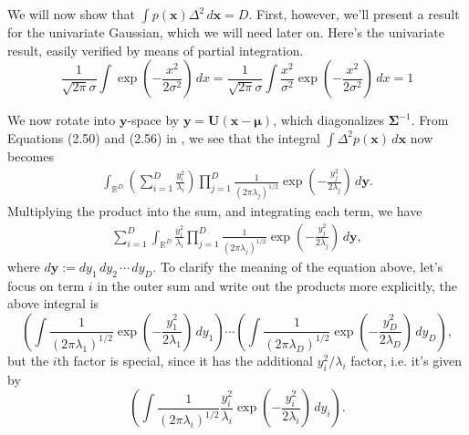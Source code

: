 \documentclass[12pt, a4paper]{article}
\newcommand{\R}{\mathbb{R}}
\newcommand{\vect}[1]{\bm{#1}}
\begin{document}
We will now show that $\int p(\vect{x}) \Delta^2 \, d\vect{x} = D$.
First, however, we'll present a result for the univariate Gaussian, which we will need later on. 
Here's the univariate result, easily verified by means of partial integration.
\begin{equation}
\label{eqn:ch2_problem15_a}
	\frac{1}{\sqrt{2 \pi} \sigma} \int \exp \left( - \frac{x^2}{2 \sigma^2}\right) \, dx = 
	\frac{1}{\sqrt{2 \pi} \sigma} \int \frac{x^2}{\sigma^2} \exp \left( - \frac{x^2}{2 \sigma^2}\right) \, dx = 1
\end{equation}

We now rotate into $\vect{y}$-space by $\vect{y} = \vect{U}(\vect{x} - \vect{\mu})$, which diagonalizes $\vect{\Sigma}^{-1}$.
From Equations (2.50) and (2.56) in \cite{bishop_pattern_2011}, we see that the integral $\int \Delta^2  p(\vect{x}) \, d\vect{x}$ now becomes
\begin{align*}
	\int_{\R^D} \left( \sum_{i=1}^{D} \frac{y_i^2}{\lambda_i} \right)
	\prod_{j=1}^{D} \frac{1}{(2 \pi \lambda_j)^{1/2}} 
	\exp \left( - \frac{y_j^2}{2 \lambda_j} \right) \, d \vect{y}.
\end{align*}
Multiplying the product into the sum, and integrating each term, we have
\begin{align*}
\sum_{i=1}^{D} \int_{\R^D}  \frac{y_i^2}{\lambda_i} 
\prod_{j=1}^{D} \frac{1}{(2 \pi \lambda_j)^{1/2}} 
\exp \left( - \frac{y_j^2}{2 \lambda_j} \right)  \, d \vect{y},
\end{align*}
where $d \vect{y} := d y_1 \, d y_2 \, \cdots \, d y_D$.
To clarify the meaning of the equation above, let's focus on term $i$ in the outer sum and write out the products more explicitly, the above integral is
\begin{equation}
\label{eqn:ch2_problem15_b}
	\left( \int \frac{1}{(2 \pi \lambda_1)^{1/2}} \exp \left( - \frac{y_1^2}{2 \lambda_1} \right) \, d y_1 \right)
	\cdots
	\left( \int \frac{1}{(2 \pi \lambda_D)^{1/2}} \exp \left( - \frac{y_D^2}{2 \lambda_D} \right) \, d y_D \right),
\end{equation}
but the $i$th factor is special, since it has the additional $y_i^2 / \lambda_i$ factor, i.e. it's given by
\begin{equation}
\label{eqn:ch2_problem15_c}
	\left( \int \frac{1}{(2 \pi \lambda_i)^{1/2}} \frac{y_i^2}{\lambda_i}   \exp \left( - \frac{y_i^2}{2 \lambda_i} \right) \, d y_i \right).
\end{equation}
\end{document}
